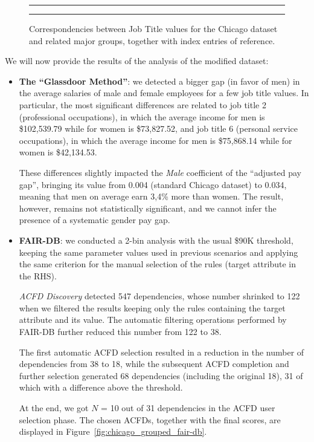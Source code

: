 \begin{figure}[t!]
\centering
\noindent\rule{\linewidth}{0.4pt}\par
\noindent\rule{\linewidth}{0.4pt}
\caption{Correspondencies between \textrm{Job Title} values for the Chicago dataset and related major groups, together with index entries of reference.}
\label{fig:encodings}
\end{figure}

We will now provide the results of the analysis of the modified dataset:
\begin{itemize}
\item \textbf{The ``Glassdoor Method''}: we detected a bigger gap (in favor of men) in the average salaries of male and female employees for a few job title values. In particular, the most significant differences are related to job title 2 (professional occupations), in which the average income for men is \$102,539.79 while for women is \$73,827.52, and job title 6 (personal service occupations), in which the average income for men is \$75,868.14 while for women is \$42,134.53.

These differences slightly impacted the \textit{Male} coefficient of the ``adjusted pay gap'', bringing its value from 0.004 (standard Chicago dataset) to 0.034, meaning that men on average earn 3,4\% more than women. The result, however, remains not statistically significant, and we cannot infer the presence of a systematic gender pay gap.
\item \textbf{FAIR-DB}: we conducted a 2-bin analysis with the usual \$90K threshold, keeping the same parameter values used in previous scenarios and applying the same criterion for the manual selection of the rules (target attribute in the RHS).

\textit{ACFD Discovery} detected 547 dependencies, whose number shrinked to 122 when we filtered the results keeping only the rules containing the target attribute and its value. The automatic filtering operations performed by FAIR-DB further reduced this number from 122 to 38.

The first automatic ACFD selection resulted in a reduction in the number of dependencies from 38 to 18, while the subsequent ACFD completion and further selection generated 68 dependencies (including the original 18), 31 of which with a difference above the threshold.

At the end, we got \(N\) = 10 out of 31 dependencies in the ACFD user selection phase. The chosen ACFDs, together with the final scores, are displayed in Figure~\ref{fig:chicago_grouped_fair-db}.


\end{itemize}
